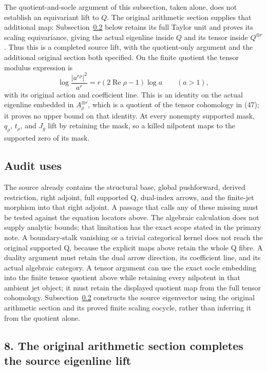\documentclass[10pt,a4paper,oneside]{report}
\begin{document}
The quotient-and-socle argument of this subsection, taken alone, does not establish an equivariant lift to \(Q\). The original arithmetic section supplies that additional map: Subsection~\ref{proof01:source-maps-completed-source-eigenline-lift} below retains its full Taylor unit and proves its scaling equivariance, giving the actual eigenline inside \(Q\) and its tensor inside \(Q^{\otimes r}\). Thus this is a completed source lift, with the quotient-only argument and the additional original section both specified. On the finite quotient the tensor modulus expression is \[
\log\frac{|a^{r\rho}|^2}{a^r}=r(2\operatorname{Re}\rho-1)\log a
\qquad(a>1),
\] with its original action and coefficient line. This is an identity on the actual eigenline embedded in \(A_\rho^{\otimes r}\), which is a quotient of the tensor cohomology in (47); it proves no upper bound on that identity. At every nonempty supported mask, \(q_\rho\), \(t_\rho\), and \(J_g\) lift by retaining the mask, so a killed nilpotent maps to the supported zero of its mask.

\subsection{Audit uses}\label{proof01:source-maps-audit-uses}

The source already contains the structural base, global pushforward, derived restriction, right adjoint, full supported Q, dual-index arrows, and the finite-jet morphism into that right adjoint. A passage that calls any of these missing must be tested against the equation locators above. The algebraic calculation does not supply analytic bounds; that limitation has the exact scope stated in the primary note. A boundary-stalk vanishing or a trivial categorical kernel does not reach the original supported Q, because the explicit maps above retain the whole Q fibre. A duality argument must retain the dual arrow direction, its coefficient line, and its actual algebraic category. A tensor argument can use the exact socle embedding into the finite tensor quotient above while retaining every nilpotent in that ambient jet object; it must retain the displayed quotient map from the full tensor cohomology. Subsection~\ref{proof01:source-maps-completed-source-eigenline-lift} constructs the source eigenvector using the original arithmetic section and its proved finite scaling cocycle, rather than inferring it from the quotient alone.


\subsection{8. The original arithmetic section completes the source eigenline lift}
\label{proof01:source-maps-completed-source-eigenline-lift}
\end{document}
